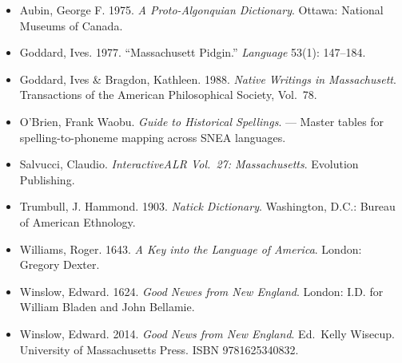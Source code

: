 \begin{itemize}
  \item Aubin, George F. 1975. \emph{A Proto-Algonquian Dictionary}. Ottawa:
    National Museums of Canada.
  \item Goddard, Ives. 1977. ``Massachusett Pidgin.'' \emph{Language} 53(1):
    147--184.
  \item Goddard, Ives \& Bragdon, Kathleen. 1988. \emph{Native Writings in
    Massachusett}. Transactions of the American Philosophical Society, Vol.\ 78.
  \item O'Brien, Frank Waobu. \emph{Guide to Historical Spellings}. --- Master
    tables for spelling-to-phoneme mapping across SNEA languages.
  \item Salvucci, Claudio. \emph{InteractiveALR Vol.\ 27: Massachusetts}.
    Evolution Publishing.
  \item Trumbull, J. Hammond. 1903. \emph{Natick Dictionary}. Washington, D.C.:
    Bureau of American Ethnology.
  \item Williams, Roger. 1643. \emph{A Key into the Language of America}.
    London: Gregory Dexter.
  \item Winslow, Edward. 1624. \emph{Good Newes from New England}. London: I.D.
    for William Bladen and John Bellamie.
  \item Winslow, Edward. 2014. \emph{Good News from New England}. Ed.\ Kelly
    Wisecup. University of Massachusetts Press. ISBN 9781625340832.
\end{itemize}
